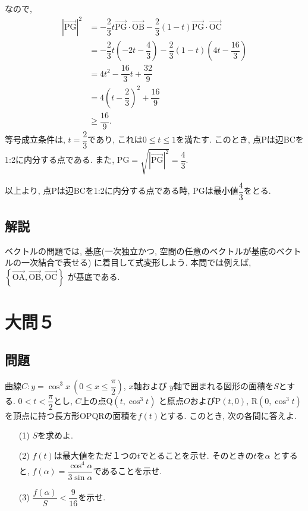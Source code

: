 \documentclass[dvipdfmx,a4paper]{jsarticle}
\newcommand{\al}{\alpha}
\newcommand{\oraw}{\overrightarrow}
\newcommand{\2}{I\hspace{-1pt}I}
\newcommand{\3}{I\hspace{-1pt}I\hspace{-1pt}I}
\begin{document}
\begin{itemize}
        なので, 
        \begin{align*}
            |\oraw{\mathrm{PG}}|^2 
            &= - \dfrac{2}{3}t \oraw{\mathrm{PG}} \cdot \oraw{\mathrm{OB}} - \dfrac{2}{3} (1-t) \oraw{\mathrm{PG}} \cdot \oraw{\mathrm{OC}} \\
            &= - \dfrac{2}{3}t \left(-2t - \dfrac{4}{3}\right) - \dfrac{2}{3} (1-t) \left(4t - \dfrac{16}{3}\right) \\
            &= 4t^2 - \dfrac{16}{3}t + \dfrac{32}{9} \\
            &= 4 \left(t- \dfrac{2}{3}\right)^2 + \dfrac{16}{9} \\
            &\geq \dfrac{16}{9}. 
        \end{align*}
        等号成立条件は, $t=\dfrac{2}{3}$であり, これは$0\leq t\leq 1$を満たす. 
        このとき, 点Pは辺BCを1:2に内分する点である. また, $\mathrm{PG} = \sqrt{|\oraw{\mathrm{PG}}|^2 } = \dfrac{4}{3}$. 

        以上より, 点Pは辺BCを1:2に内分する点である時, PGは最小値$\dfrac{4}{3}$をとる. 

    \end{itemize}
    
    \subsection{解説}
    ベクトルの問題では, 基底(一次独立かつ, 空間の任意のベクトルが基底のベクトルの一次結合で表せる)
    に着目して式変形しよう. 本問では例えば, $\left\{\oraw{\mathrm{OA}}, \oraw{\mathrm{OB}}, \oraw{\mathrm{OC}}\right\}$
    が基底である. 
    
    \section{大問５}
    \subsection{問題}
    曲線$C: y=\cos ^3 x \ \left(0 \leq x \leq \dfrac{\pi}{2}\right)$, $x$軸および
    $y$軸で囲まれる図形の面積を$S$とする. $0<t<\dfrac{\pi}{2}$とし, $C$上の点Q$(t, \cos ^3 t)$
    と原点$O$およびP$(t,0)$, R$(0, \cos ^3 t)$を頂点に持つ長方形OPQRの面積を$f(t)$とする. 
    このとき, 次の各問に答えよ. 
    \begin{itemize}
        \item [(1)] $S$を求めよ. 
        \item [(2)] $f(t)$は最大値をただ１つの$t$でとることを示せ. そのときの$t$を$\al$
        とすると, $f(\al) = \dfrac{\cos ^4 \al}{3 \sin \al}$であることを示せ. 
        \item [(3)] $\dfrac{f(\al)}{S} < \dfrac{9}{16}$を示せ. 
    \end{itemize}
\end{document}
